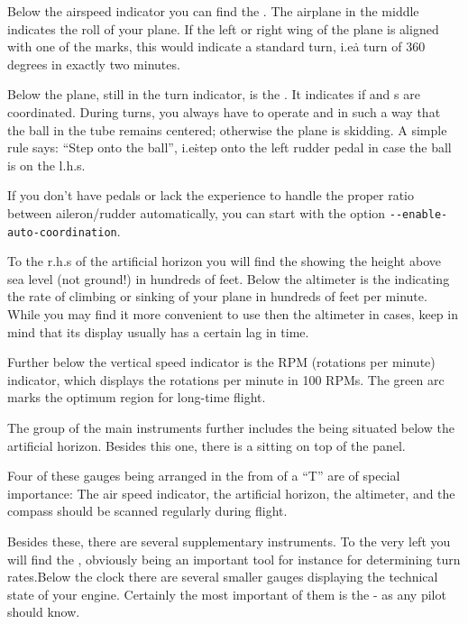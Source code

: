 Below the airspeed indicator you can find the . The
airplane in the
middle indicates the roll of your plane. If the left or right wing of the plane
is
aligned with one of the marks, this would indicate a standard turn, i.e\. a turn
of 360
degrees in exactly two minutes.

Below the plane, still in the turn indicator, is the . It
indicates
if  and s are coordinated. During turns, you always
have to
operate  and  in such a way that the ball in the
tube
remains centered; otherwise the plane is skidding. A simple rule says:
``Step onto the ball'', i.e\. step onto the left rudder pedal in case
the ball is on the l.h.s.
\medskip

If you don't have pedals or lack the experience to handle the proper
ratio between aileron/rudder automatically, you can start \FlightGear{}
with the option \texttt{-$ $-enable-auto-coordination}.

To the r.h.s of the artificial horizon you will find the 
showing the height
above sea level (not ground!) in hundreds of feet.  Below the altimeter is the
 indicating the rate of climbing or sinking of
your plane
in hundreds of feet per minute. While you may find it more convenient to use
then the
altimeter in cases, keep in mind that its display usually has a certain lag in
time.

Further below the vertical speed indicator is the RPM (rotations per minute)
indicator, which displays the rotations per minute  in 100
RPMs. The
green arc marks the optimum region for long-time flight.

The group of the main instruments further includes the 
being
situated below the artificial horizon. Besides this one, there is a
 sitting on top of the panel.

Four of these gauges being arranged in the from of a ``T'' are of special
importance: The
air speed indicator, the artificial horizon, the altimeter, and the compass
should be
scanned regularly during flight.

Besides these, there are several supplementary instruments. To the very
left you will find the , obviously being an important tool
for instance for determining turn rates.Below the clock there are
several smaller gauges displaying the technical state of your engine.
Certainly the most important of them is the  - as
any pilot should know.


